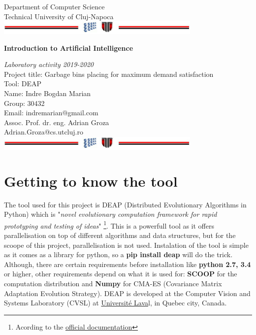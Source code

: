 \documentclass[a4paper,12pt]{report}
\begin{document}
\vspace{-5cm}
\begin{center}
Department of Computer Science\\
Technical University of Cluj-Napoca\\
\includegraphics[width=10cm]{fig/footer}
\end{center}
\vspace{1cm}
\begin{center}
\begin{Large}
\textbf{Introduction to Artificial Intelligence}\\
\end{Large}
\textit{Laboratory activity 2019-2020}\\
\vspace{3cm}
Project title: Garbage bins placing for maximum demand satisfaction\\
Tool: DEAP\\
\vspace{1.5cm}
Name: Indre Bogdan Marian\\
Group: 30432\\
Email: indremarian@gmail.com\\
\vspace{6cm}
Assoc. Prof. dr. eng. Adrian Groza\\
Adrian.Groza@cs.utcluj.ro\\
\vspace{1cm}
\includegraphics[width=10cm]{fig/footer}
\end{center}

\tableofcontents

\chapter{Getting to know the tool}

The tool used for this project is DEAP (Distributed Evolutionary Algorithms in Python) which is "\textit {novel evolutionary computation framework for rapid prototyping and testing of ideas}" \footnote {Acording to the \href {https://deap.readthedocs.io/en/master/index.html} {official documentation} }. This is a powerfull tool as it offers parallelisation on top of different algorithms and data structures, but for the scoope of this project, parallelisation is not used. 
Instalation of the tool is simple as it comes as a library for python, so a \textbf {pip install deap} will do the trick. Although, there are certain requirements before installation like \textbf {python 2.7, 3.4} or higher, other requirements depend on what it is used for: \textbf {SCOOP} for the computation distribution and \textbf {Numpy} for CMA-ES (Covariance Matrix Adaptation Evolution Strategy). DEAP is developed at the Computer Vision and Systems Laboratory (CVSL) at \href {https://www.ulaval.ca/}{Université Lava}l, in Quebec city, Canada.
\end{document}
